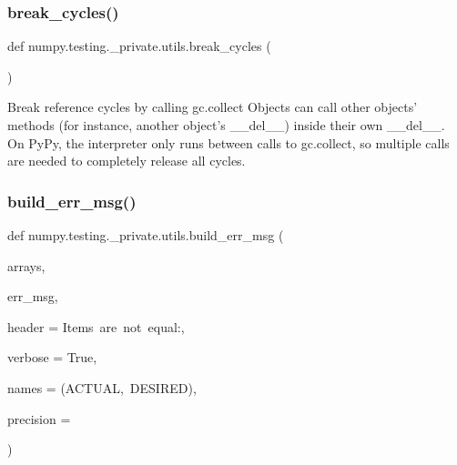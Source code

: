 \subsubsection{\texorpdfstring{break\+\_\+cycles()}{break\_cycles()}}
{\footnotesize\ttfamily def numpy.\+testing.\+\_\+private.\+utils.\+break\+\_\+cycles (\begin{DoxyParamCaption}{ }\end{DoxyParamCaption})}

\begin{DoxyVerb}Break reference cycles by calling gc.collect
Objects can call other objects' methods (for instance, another object's
 __del__) inside their own __del__. On PyPy, the interpreter only runs
between calls to gc.collect, so multiple calls are needed to completely
release all cycles.
\end{DoxyVerb}
 \mbox{\label{namespacenumpy_1_1testing_1_1__private_1_1utils_aeb0b7d37f6998658b37b4c940107b82b}} 
\subsubsection{\texorpdfstring{build\+\_\+err\+\_\+msg()}{build\_err\_msg()}}
{\footnotesize\ttfamily def numpy.\+testing.\+\_\+private.\+utils.\+build\+\_\+err\+\_\+msg (\begin{DoxyParamCaption}\item[{}]{arrays,  }\item[{}]{err\+\_\+msg,  }\item[{}]{header = {\ttfamily \textquotesingle{}Items~are~not~equal\+:\textquotesingle{}},  }\item[{}]{verbose = {\ttfamily True},  }\item[{}]{names = {\ttfamily (\textquotesingle{}ACTUAL\textquotesingle{},~\textquotesingle{}DESIRED\textquotesingle{})},  }\item[{}]{precision = {} }\end{DoxyParamCaption})}

\mbox{\label{namespacenumpy_1_1testing_1_1__private_1_1utils_a5ee52c7dc93bdc4ac9cbc2c0460197d9}} 
